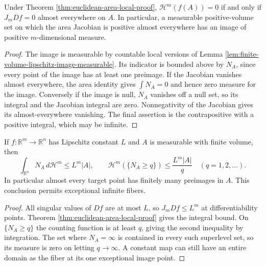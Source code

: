\begin{corollary}\label{cor:area-null-image-criterion}
Under Theorem \ref{thm:euclidean-area-local-proof}, $\mathcal H^m(f(A))=0$ if and only if $J_mDf=0$ almost everywhere on $A$. In particular, a measurable positive-volume set on which the area Jacobian is positive almost everywhere has an image of positive $m$-dimensional measure.
\end{corollary}
\begin{proof}
The image is measurable by countable local versions of Lemma \ref{lem:finite-volume-lipschitz-image-measurable}. Its indicator is bounded above by $N_A$, since every point of the image has at least one preimage. If the Jacobian vanishes almost everywhere, the area identity gives $\int N_A=0$ and hence zero measure for the image. Conversely if the image is null, $N_A$ vanishes off a null set, so its integral and the Jacobian integral are zero. Nonnegativity of the Jacobian gives its almost-everywhere vanishing. The final assertion is the contrapositive with a positive integral, which may be infinite.
\end{proof}

\begin{proposition}\label{prop:area-integrable-multiplicity}
If $f:\mathbb R^m\to\mathbb R^n$ has Lipschitz constant $L$ and $A$ is measurable with finite volume, then
\[
 \int_{\mathbb R^n}N_A\,d\mathcal H^m\leq L^m|A|,
 \qquad
 \mathcal H^m(\{N_A\geq q\})\leq\frac{L^m|A|}{q}
 \quad(q=1,2,\ldots).
\]
In particular almost every target point has finitely many preimages in $A$. This conclusion permits exceptional infinite fibers.
\end{proposition}
\begin{proof}
All singular values of $Df$ are at most $L$, so $J_mDf\leq L^m$ at differentiability points. Theorem \ref{thm:euclidean-area-local-proof} gives the integral bound. On $\{N_A\geq q\}$ the counting function is at least $q$, giving the second inequality by integration. The set where $N_A=\infty$ is contained in every such superlevel set, so its measure is zero on letting $q\to\infty$. A constant map can still have an entire domain as the fiber at its one exceptional image point.
\end{proof}
